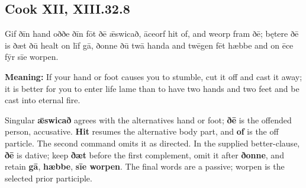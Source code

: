 \par\begin{minipage}{\linewidth}\raggedright
\subsection*{Cook XII, XIII.32.8}

Gif ðīn hand oððe ðīn fōt ðē ǣswicað, āceorf hit of, and weorp fram ðē; bętere ðē is ðæt ðū healt on līf gā, ðonne ðū twā handa and twēgen fēt hæbbe and on ēce fȳr sīe worpen.

\textbf{Meaning:} If your hand or foot causes you to stumble, cut it off and cast it away; it is better for you to enter life lame than to have two hands and two feet and be cast into eternal fire.

Singular \textbf{ǣswicað} agrees with the alternatives hand or foot; \textbf{ðē} is the offended person, accusative. \textbf{Hit} resumes the alternative body part, and \textbf{of} is the off particle. The second command omits it as directed. In the supplied better-clause, \textbf{ðē} is dative; keep \textbf{ðæt} before the first complement, omit it after \textbf{ðonne}, and retain \textbf{gā}, \textbf{hæbbe}, \textbf{sīe worpen}. The final words are a passive; worpen is the selected prior participle.

\end{minipage}\par\addvspace{4pt}

